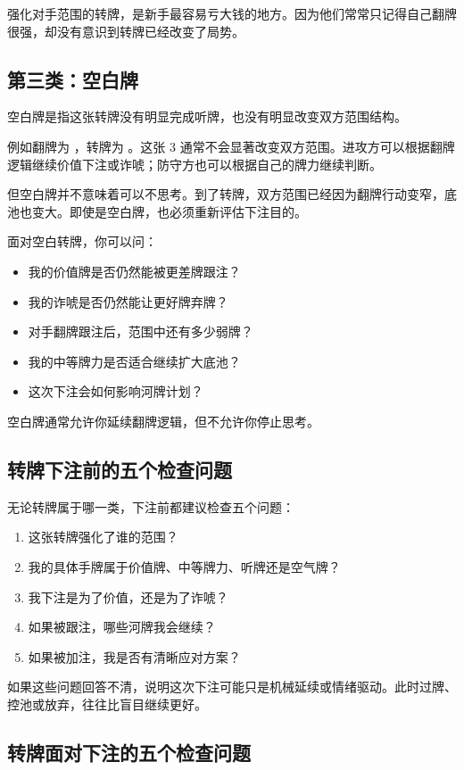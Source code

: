 强化对手范围的转牌，是新手最容易亏大钱的地方。因为他们常常只记得自己翻牌很强，却没有意识到转牌已经改变了局势。

\subsection{第三类：空白牌}

空白牌是指这张转牌没有明显完成听牌，也没有明显改变双方范围结构。

例如翻牌为 ，转牌为 。这张 3 通常不会显著改变双方范围。进攻方可以根据翻牌逻辑继续价值下注或诈唬；防守方也可以根据自己的牌力继续判断。

但空白牌并不意味着可以不思考。到了转牌，双方范围已经因为翻牌行动变窄，底池也变大。即使是空白牌，也必须重新评估下注目的。

面对空白转牌，你可以问：

\begin{itemize}
\item 我的价值牌是否仍然能被更差牌跟注？
\item 我的诈唬是否仍然能让更好牌弃牌？
\item 对手翻牌跟注后，范围中还有多少弱牌？
\item 我的中等牌力是否适合继续扩大底池？
\item 这次下注会如何影响河牌计划？
\end{itemize}

空白牌通常允许你延续翻牌逻辑，但不允许你停止思考。

\subsection{转牌下注前的五个检查问题}

无论转牌属于哪一类，下注前都建议检查五个问题：

\begin{enumerate}
\item 这张转牌强化了谁的范围？
\item 我的具体手牌属于价值牌、中等牌力、听牌还是空气牌？
\item 我下注是为了价值，还是为了诈唬？
\item 如果被跟注，哪些河牌我会继续？
\item 如果被加注，我是否有清晰应对方案？
\end{enumerate}

如果这些问题回答不清，说明这次下注可能只是机械延续或情绪驱动。此时过牌、控池或放弃，往往比盲目继续更好。

\subsection{转牌面对下注的五个检查问题}

